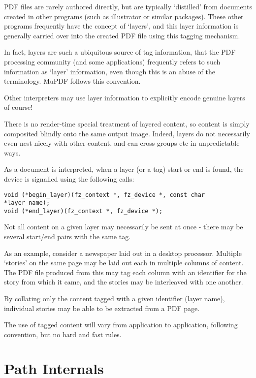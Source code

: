 \documentclass[oneside]{book}
\begin{document}
PDF files are rarely authored directly, but are typically `distilled' from documents created in other programs (such as illustrator or similar packages). These other programs frequently have the concept of `layers', and this layer information is generally carried over into the created PDF file using this tagging mechanism.

In fact, layers are such a ubiquitous source of tag information, that the PDF processing community (and some applications) frequently refers to such information as `layer' information, even though this is an abuse of the terminology. MuPDF follows this convention.

Other interpreters may use layer information to explicitly encode genuine layers of course!

There is no render-time special treatment of layered content, so content is simply composited blindly onto the same output image. Indeed, layers do not necessarily even nest nicely with other content, and can cross groups etc in unpredictable ways.

As a document is interpreted, when a layer (or a tag) start or end is found, the device is signalled using the following calls:

\begin{lstlisting}
void (*begin_layer)(fz_context *, fz_device *, const char *layer_name);
void (*end_layer)(fz_context *, fz_device *);
\end{lstlisting}

Not all content on a given layer may necessarily be sent at once - there may be several start/end pairs with the same tag.

As an example, consider a newspaper laid out in a desktop processor. Multiple `stories' on the same page may be laid out each in multiple  columns of content. The PDF file produced from this may tag each column with an identifier for the story from which it came, and the stories may be interleaved with one another.

By collating only the content tagged with a given identifier (layer name), individual stories may be able to be extracted from a PDF page.

The use of tagged content will vary from application to application, following convention, but no hard and fast rules.

\chapter{Path Internals}
\label{Paths}
\end{document}
